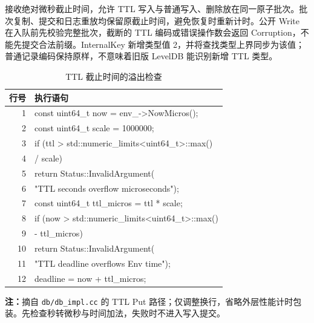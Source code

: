 \documentclass[UTF8,a4paper,10pt,twocolumn,fontset=fandol]{ctexart}
\begin{document}
 接收绝对微秒截止时间，允许 TTL 写入与普通写入、删除放在同一原子批次。批次复制、提交和日志重放均保留原截止时间，避免恢复时重新计时。公开 Write 在入队前先校验完整批次，截断的 TTL 编码或错误操作数会返回 Corruption，不能先提交合法前缀。InternalKey 新增类型值 2，并将查找类型上界同步为该值；普通记录编码保持原样，不意味着旧版 LevelDB 能识别新增 TTL 类型。

\begin{table}[!htbp]
\centering
\caption{TTL 截止时间的溢出检查}
\label{tab:code-ttl}
\setlength{\tabcolsep}{3pt}
\renewcommand{\arraystretch}{1.05}
\begin{tabularx}{\columnwidth}{@{}r>{\ttfamily\fontsize{7.5}{9.5}\selectfont\raggedright\arraybackslash}X@{}}
\toprule
{\small 行号} & {\normalfont\small 执行语句} \\
\midrule
1 & const uint64\_t now = env\_->NowMicros(); \\
2 & const uint64\_t scale = 1000000; \\
3 & if (ttl > std::numeric\_limits<uint64\_t>::max() \\
4 & \hspace*{4.5em}/ scale) \\
5 & \hspace*{0.9em}return Status::InvalidArgument( \\
6 & \hspace*{2.7em}"TTL seconds overflow microseconds"); \\
7 & const uint64\_t ttl\_micros = ttl * scale; \\
8 & if (now > std::numeric\_limits<uint64\_t>::max() \\
9 & \hspace*{4.5em}- ttl\_micros) \\
10 & \hspace*{0.9em}return Status::InvalidArgument( \\
11 & \hspace*{2.7em}"TTL deadline overflows Env time"); \\
12 & deadline = now + ttl\_micros; \\
\bottomrule
\end{tabularx}
\par\vspace{3pt}
\parbox{\columnwidth}{\footnotesize\raggedright\textbf{注：}摘自 \texttt{db/db\_impl.cc} 的 TTL Put 路径；仅调整换行，省略外层性能计时包装。先检查秒转微秒与时间加法，失败时不进入写入提交。}
\end{table}
\end{document}

